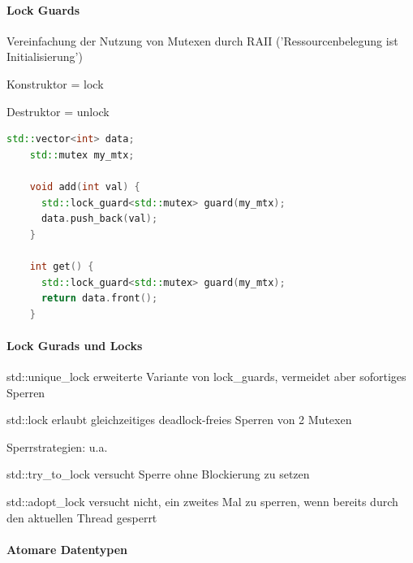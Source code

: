 \documentclass[10pt]{article}
\begin{document}
\paragraph{Lock Guards}

\begin{itemize*}
  \item Vereinfachung der Nutzung von Mutexen durch RAII ('Ressourcenbelegung ist Initialisierung')
  \item Konstruktor = lock
  \item Destruktor = unlock
\end{itemize*}

\begin{lstlisting}[language=C++]
    std::vector<int> data;
    std::mutex my_mtx;
  
    void add(int val) {
      std::lock_guard<std::mutex> guard(my_mtx);
      data.push_back(val);
    }
  
    int get() {
      std::lock_guard<std::mutex> guard(my_mtx);
      return data.front();
    }
    \end{lstlisting}

\paragraph{Lock Gurads und Locks}

\begin{itemize*}
  \item std::unique\_lock erweiterte Variante von lock\_guards, vermeidet aber sofortiges Sperren
  \item std::lock erlaubt gleichzeitiges deadlock-freies Sperren von 2 Mutexen
  \item Sperrstrategien: u.a.
  \begin{itemize*}
    \item std::try\_to\_lock versucht Sperre ohne Blockierung zu setzen
    \item std::adopt\_lock versucht nicht, ein zweites Mal zu sperren, wenn bereits durch den aktuellen Thread gesperrt
  \end{itemize*}
\end{itemize*}

\paragraph{Atomare Datentypen}
\end{document}
